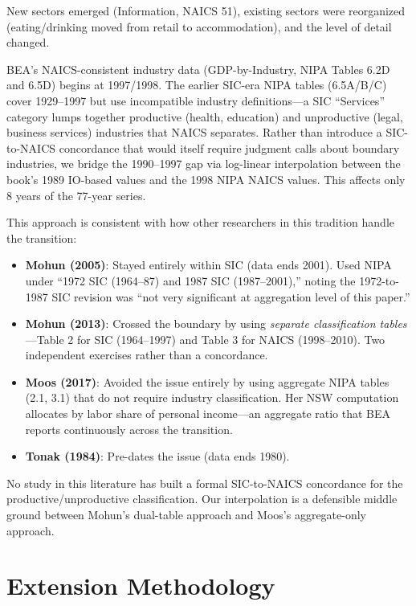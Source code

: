 \documentclass[12pt,a4paper]{article}
\begin{document}
New sectors emerged (Information, NAICS 51), existing sectors were reorganized (eating/drinking moved from retail to accommodation), and the level of detail changed.

BEA's NAICS-consistent industry data (GDP-by-Industry, NIPA Tables 6.2D and 6.5D) begins at 1997/1998. The earlier SIC-era NIPA tables (6.5A/B/C) cover 1929--1997 but use incompatible industry definitions---a SIC ``Services'' category lumps together productive (health, education) and unproductive (legal, business services) industries that NAICS separates. Rather than introduce a SIC-to-NAICS concordance that would itself require judgment calls about boundary industries, we bridge the 1990--1997 gap via log-linear interpolation between the book's 1989 IO-based values and the 1998 NIPA NAICS values. This affects only 8 years of the 77-year series.

This approach is consistent with how other researchers in this tradition handle the transition:
\begin{itemize}
\item \textbf{Mohun (2005)}: Stayed entirely within SIC (data ends 2001). Used NIPA under ``1972 SIC (1964--87) and 1987 SIC (1987--2001),'' noting the 1972-to-1987 SIC revision was ``not very significant at aggregation level of this paper.''
\item \textbf{Mohun (2013)}: Crossed the boundary by using \textit{separate classification tables}---Table 2 for SIC (1964--1997) and Table 3 for NAICS (1998--2010). Two independent exercises rather than a concordance.
\item \textbf{Moos (2017)}: Avoided the issue entirely by using aggregate NIPA tables (2.1, 3.1) that do not require industry classification. Her NSW computation allocates by labor share of personal income---an aggregate ratio that BEA reports continuously across the transition.
\item \textbf{Tonak (1984)}: Pre-dates the issue (data ends 1980).
\end{itemize}

No study in this literature has built a formal SIC-to-NAICS concordance for the productive/unproductive classification. Our interpolation is a defensible middle ground between Mohun's dual-table approach and Moos's aggregate-only approach.

\section{Extension Methodology}
\end{document}

